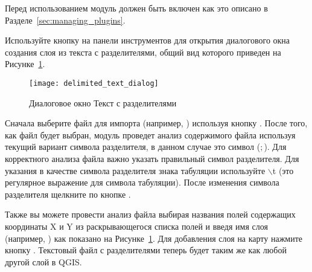 Перед использованием модуль должен быть включен как это описано в
Разделе~\ref{sec:managing_plugins}.

Используйте кнопку 
на панели инструментов для открытия диалогового окна создания слоя из
текста с разделителями, общий вид которого приведен на Рисунке~\ref{fig:delim_text_plugin_dialog}.

\begin{figure}[ht]
   \centering
   \texttt{[image: delimited\_text\_dialog]}
   \caption{Диалоговое окно Текст с разделителями \wincaption}\label{fig:delim_text_plugin_dialog}
\end{figure}

Сначала выберите файл для импорта (например, )
используя кнопку . После того, как файл будет выбран, модуль
проведет анализ содержимого файла используя текущий вариант символа
разделителя, в данном случае это символ (\mbox{$;$}). Для корректного
анализа файла важно указать правильный символ разделителя. Для указания
в качестве символа разделителя знака табуляции используйте
\mbox{$\backslash$}t (это регулярное выражение для символа табуляции).
После изменения символа разделителя щелкните по кнопке .

Также вы можете провести анализ файла выбирая названия полей содержащих
координаты X и Y из раскрывающегося списка полей и введя имя слоя
(например,  ) как показано на Рисунке~\ref{fig:delim_text_plugin_dialog}.
Для добавления слоя на карту нажмите кнопку . Текстовый файл
с разделителями теперь будет таким же как любой другой слой в QGIS.

\FloatBarrier
